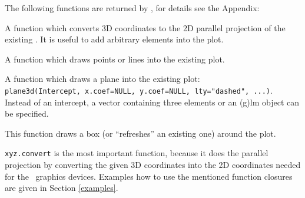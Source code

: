 The following functions are returned by \sdd , for details see the Appendix:\\ \vspace{-11mm}
\begin{description} \setlength\itemsep{0.5ex plus0.2ex minus0.3ex}
\item[{\tt xyz.convert}:] A function which converts 3D coordinates to the 2D parallel projection of the existing \sdd .
                        It is useful to add arbitrary elements into the plot.
\item[{\tt points3d}:]  A function which draws points or lines into the existing plot.
\item[{\tt plane3d}:]   A function which draws a plane into the existing plot:\\
    \verb+plane3d(Intercept, x.coef=NULL, y.coef=NULL, lty="dashed", ...)+.
    Instead of an intercept, a vector containing three elements or an \textsf{(g)lm} object can be specified.
\item[{\tt box3d}:]     This function draws a box (or ``refreshes'' an existing one) around the plot.
\end{description}
{\tt xyz.convert} is the most important function, because it does the parallel projection
by converting the given 3D coordinates into the 2D coordinates needed for the \RR\ graphics devices.
Examples how to use the mentioned function closures are given in Section \ref{examples}.


